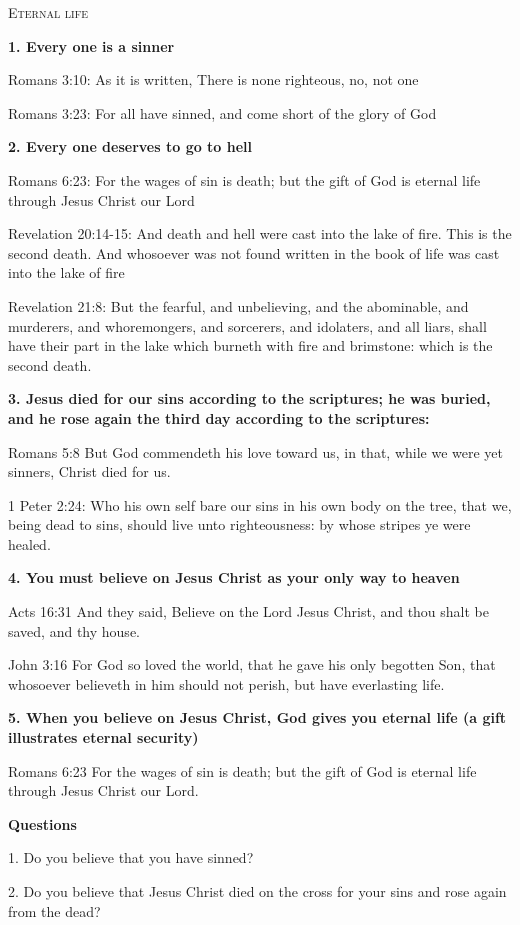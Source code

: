 \textsc{Eternal life}

\textbf{1. Every one is a sinner}

Romans 3:10: As it is written, There is none righteous, no, not one

Romans 3:23: For all have sinned, and come short of the glory of God


\textbf{2. Every one deserves to go to hell}

Romans 6:23: For the wages of sin is death; but the gift of God is eternal life through Jesus Christ our Lord

Revelation 20:14-15:  And death and hell were cast into the lake of fire. This is the second death.  And whosoever was not found written in the book of life was cast into the lake of fire

Revelation 21:8:  But the fearful, and unbelieving, and the abominable, and murderers, and whoremongers, and sorcerers, and idolaters, and all liars, shall have their part in the lake which burneth with fire and brimstone: which is the second death.


\textbf{3. Jesus died for our sins according to the scriptures; he was buried, and he rose again the third day according to the scriptures:}

Romans 5:8 But God commendeth his love toward us, in that, while we were yet sinners, Christ died for us.

1 Peter 2:24: Who his own self bare our sins in his own body on the tree, that we, being dead to sins, should live unto righteousness: by whose stripes ye were healed.


\textbf{4. You must believe on Jesus Christ as your only way to heaven}

Acts 16:31  And they said, Believe on the Lord Jesus Christ, and thou shalt be saved, and thy house.

John 3:16  For God so loved the world, that he gave his only begotten Son, that whosoever believeth in him should not perish, but have everlasting life.


\textbf{5. When you believe on Jesus Christ, God gives you eternal life (a gift illustrates eternal security)}

Romans 6:23  For the wages of sin is death; but the gift of God is eternal life through Jesus Christ our Lord.


\textbf{Questions}

  1. Do you believe that you have sinned?

  2. Do you believe that Jesus Christ died on the cross for your sins and rose again from the dead?

